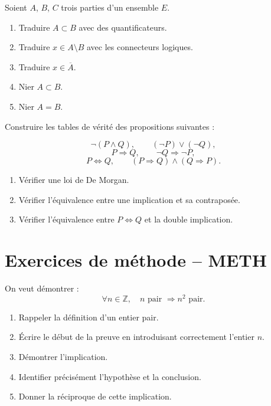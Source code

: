 \documentclass[11pt,a4paper]{article}
\newcommand{\Z}{\mathbb{Z}}
\newcommand{\non}{\neg}
\newcommand{\et}{\wedge}
\newcommand{\ou}{\vee}
\newcommand{\imp}{\Rightarrow}
\newcommand{\ssi}{\Longleftrightarrow}
\begin{document}
\begin{exercicebox}
Soient \(A\), \(B\), \(C\) trois parties d'un ensemble \(E\).

\begin{enumerate}[label=\alph*)]
    \item Traduire \(A\subset B\) avec des quantificateurs.
    \item Traduire \(x\in A\setminus B\) avec les connecteurs logiques.
    \item Traduire \(x\in \overline{A}\).
    \item Nier \(A\subset B\).
    \item Nier \(A=B\).
\end{enumerate}
\end{exercicebox}

\begin{exercicebox}
Construire les tables de vérité des propositions suivantes :

\[
\non(P\et Q),\qquad (\non P)\ou(\non Q),
\]
\[
P\imp Q,\qquad \non Q\imp\non P,
\]
\[
P\ssi Q,\qquad (P\imp Q)\et(Q\imp P).
\]

\begin{enumerate}[label=\alph*)]
    \item Vérifier une loi de De Morgan.
    \item Vérifier l'équivalence entre une implication et sa contraposée.
    \item Vérifier l'équivalence entre \(P\ssi Q\) et la double implication.
\end{enumerate}
\end{exercicebox}

\section{Exercices de méthode -- METH}

\begin{exercicebox}
On veut démontrer :
\[
\forall n\in\Z,\quad n \text{ pair } \imp n^2 \text{ pair}.
\]

\begin{enumerate}[label=\alph*)]
    \item Rappeler la définition d'un entier pair.
    \item Écrire le début de la preuve en introduisant correctement l'entier \(n\).
    \item Démontrer l'implication.
    \item Identifier précisément l'hypothèse et la conclusion.
    \item Donner la réciproque de cette implication.
\end{enumerate}
\end{exercicebox}
\end{document}
